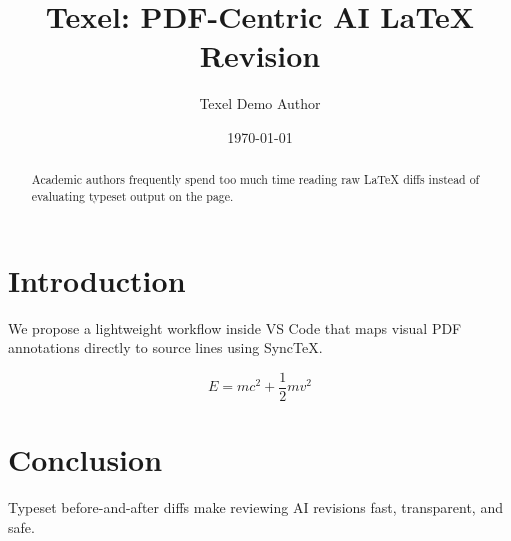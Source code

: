 \documentclass{article}
\title{Texel: PDF-Centric AI LaTeX Revision}
\author{Texel Demo Author}
\date{\today}
\begin{document}
\maketitle

\begin{abstract}
Academic authors frequently spend too much time reading raw LaTeX diffs instead of evaluating typeset output on the page.
\end{abstract}

\section{Introduction}
We propose a lightweight workflow inside VS Code that maps visual PDF annotations directly to source lines using SyncTeX.

\begin{equation}
E = m c^2 + \frac{1}{2} m v^2
\label{eq:energy}
\end{equation}

\section{Conclusion}
Typeset before-and-after diffs make reviewing AI revisions fast, transparent, and safe.
\end{document}
